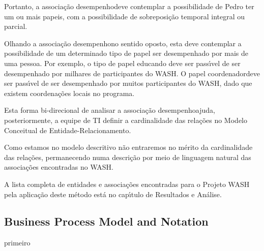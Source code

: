 \documentclass[
12pt,		%
openright,	%
twoside,  %
a4paper,			%
chapter=TITLE,		%
english,			%
french,				%
spanish,			%
brazil				%
]{USPSC-classe/USPSC_RedarTex}
\begin{document}
 Portanto, a associa\c{c}\~ao \textquotedbl desempenho\textquotedbl  deve contemplar a possibilidade de Pedro ter um ou mais papeis, com a possibilidade de sobreposi\c{c}\~ao temporal integral ou parcial.










Olhando a associa\c{c}\~ao \textquotedbl desempenho\textquotedbl  no sentido oposto, esta deve contemplar a possibilidade de um determinado tipo de papel ser desempenhado por mais de uma pessoa. Por exemplo, o tipo de papel educando deve ser pass\'{\i}vel de ser desempenhado por milhares de participantes do WASH. O papel \textquotedbl coordenador\textquotedbl  deve ser pass\'{\i}vel de ser desempenhado por muitos participantes do WASH, dado que existem coordena\c{c}\~oes locais no programa.










Esta forma bi-direcional de analisar a associa\c{c}\~ao \textquotedbl desempenho\textquotedbl  ajuda, posteriormente, a equipe de TI definir a cardinalidade das rela\c{c}\~oes no Modelo Conceitual de Entidade-Relacionamento.










Como estamos no modelo descritivo n\~ao entraremos no m\'erito da cardinalidade das rela\c{c}\~oes, permanecendo numa descri\c{c}\~ao por meio de linguagem natural das associa\c{c}\~oes encontradas no WASH.










A lista completa de entidades e associa\c{c}\~oes encontradas para o Projeto WASH pela aplica\c{c}\~ao deste m\'etodo est\'a no cap\'{\i}tulo de Resultados e An\'alise.










\subsection[Business Process Model and Notation]{Business Process Model and Notation}\label{Business Process Model and Notation}
primeiro
\end{document}
